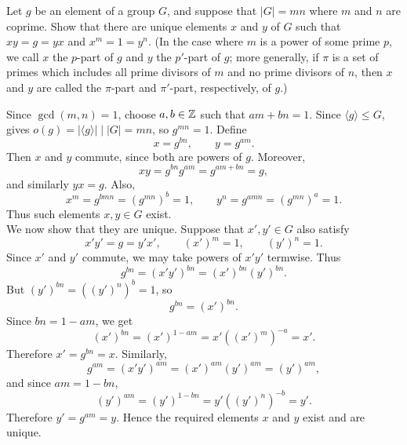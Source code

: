 \documentclass[../Odyssey_Project.tex]{subfiles}
\begin{document}
\begin{exercise}
\label{ex:1.4}
Let $g$ be an element of a group $G$, and suppose that $|G| = mn$ where $m$ and $n$ are coprime. Show that there are unique elements $x$ and $y$ of $G$ such that $xy = g = yx$ and $x^m = 1 = y^n$. (In the case where $m$ is a power of some prime $p$, we call $x$ the $p$-part of $g$ and $y$ the $p'$-part of $g$; more generally, if $\pi$ is a set of primes which includes all prime divisors of $m$ and no prime divisors of $n$, then $x$ and $y$ are called the $\pi$-part and $\pi'$-part, respectively, of $g$.)
\end{exercise}
\begin{solution}
Since \(\gcd(m,n) = 1\), choose \(a,b \in \mathbb{Z}\) such that \(am+bn = 1\). Since \(\langle g \rangle \leq G\),  gives \(o(g) = |\langle g \rangle| \mid |G| = mn\), so \(g^{mn} = 1\). Define
\[
    x = g^{bn}, \qquad y = g^{am}.
\]
Then \(x\) and \(y\) commute, since both are powers of \(g\). Moreover,
\[
    xy = g^{bn}g^{am} = g^{am+bn} = g,
\]
and similarly \(yx = g\). Also,
\[
    x^m = g^{bmn} = (g^{mn})^b = 1,
    \qquad
    y^n = g^{amn} = (g^{mn})^a = 1.
\]
Thus such elements \(x,y \in G\) exist. \\
We now show that they are unique. Suppose that \(x',y' \in G\) also satisfy
\[
    x'y' = g = y'x',
    \qquad
    (x')^m = 1,
    \qquad
    (y')^n = 1.
\]
Since \(x'\) and \(y'\) commute, we may take powers of \(x'y'\) termwise. Thus
\[
    g^{bn} = (x'y')^{bn} = (x')^{bn}(y')^{bn}.
\]
But \((y')^{bn} = ((y')^n)^b = 1\), so
\[
    g^{bn} = (x')^{bn}.
\]
Since \(bn = 1-am\), we get
\[
    (x')^{bn} = (x')^{1-am} = x'((x')^m)^{-a} = x'.
\]
Therefore \(x' = g^{bn} = x\). Similarly,
\[
    g^{am} = (x'y')^{am} = (x')^{am}(y')^{am} = (y')^{am},
\]
and since \(am = 1-bn\),
\[
    (y')^{am} = (y')^{1-bn} = y'((y')^n)^{-b} = y'.
\]
Therefore \(y' = g^{am} = y\). Hence the required elements \(x\) and \(y\) exist and are unique. \\
\end{solution}
\end{document}

